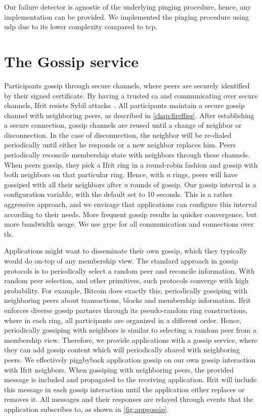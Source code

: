 \documentclass[USenglish]{uit-thesis}
\begin{document}
Our failure detector is agnostic of the underlying pinging procedure, hence, any implementation can be provided.
We implemented the pinging procedure using \gls{udp} due to its lower complexity compared to \gls{tcp}.




\section{The Gossip service}
Participants gossip through secure channels, where peers are securely identified by their signed certificate.
By having a trusted \gls{ca} and communicating over secure channels, Ifrit resists Sybil attacks~\cite{sybil}.
All participants maintain a secure gossip channel with neighboring peers, as described in \autoref{chap:fireflies}.
After establishing a secure connection, gossip channels are reused until a change of neighbor or disconnection.
In the case of disconnection, the neighbor will be re-dialed periodically until either he responds or a new neighbor replaces him.
Peers periodically reconcile membership state with neighbors through these channels.
When peers gossip, they pick a Ifrit ring in a round-robin fashion and gossip with both neighbors on that particular ring.
Hence, with \textit{n} rings, peers will have gossiped with all their neighbors after \textit{n} rounds of gossip.
Our gossip interval is a configuration variable, with the default set to 10 seconds.
This is a rather aggressive approach, and we envisage that applications can configure this interval according to their needs.
More frequent gossip results in quicker convergence, but more bandwidth usage. 
We use \gls{grpc} for all communication and connections over \gls{tls}.

Applications might want to disseminate their own gossip, which they typically would do on-top of any membership view.
The standard approach in gossip protocols is to periodically select a random peer and reconcile information.
With random peer selection, and other primitives, such protocols converge with high probability.
For example, Bitcoin \cite{bitcoin} does exactly this, periodically gossiping with neighboring peers about transactions, blocks and membership information.
Ifrit enforces diverse gossip partners through its pseudo-random ring constructions, where in each ring, all participants are organized in a different order.
Hence, periodically gossiping with neighbors is similar to selecting a random peer from a membership view.
Therefore, we provide applications with a gossip service, where they can add gossip content which will periodically shared with neighboring peers.    
We effectively piggbyback application gossip on our own gossip interaction with Ifrit neighbors.
When gossiping with neighboring peers, the provided message is included and propagated to the receiving application.
Ifrit will include this message in each gossip interaction until the application either replaces or removes it.
All messages and their responses are relayed through events that the application subscribes to, as shown in \autoref{fig:appgossip}.
\end{document}
